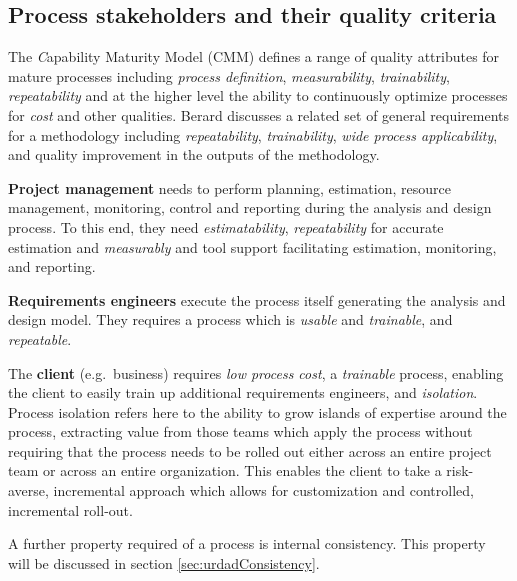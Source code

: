 
\subsection{Process stakeholders and their quality criteria}

The {\emph Capability Maturity Model} (CMM) \cite{paulk_capability_1993} defines a range of quality attributes for mature processes including \emph{process definition}, \emph{measurability}, \emph{trainability}, \emph{repeatability} and at the higher level the ability to continuously optimize processes for \emph{cost} and other qualities. Berard\cite{berard_what_1995} discusses a related set of general requirements for a methodology including \emph{repeatability}, \emph{trainability}, \emph{wide process applicability}, and quality improvement in the outputs of the methodology. 

{\bf Project management} needs to perform planning, estimation, resource management, monitoring, control and reporting during the analysis and design process. To this end, they need \emph{estimatability}, \emph{repeatability} for accurate estimation and \emph{measurably} and tool support facilitating estimation, monitoring, and reporting.

{\bf Requirements engineers} execute the process itself generating the analysis and design model. They requires a process which is \emph{usable} and \emph{trainable}, and \emph{repeatable}.

The {\bf client} (e.g.\ business) requires \emph{low process cost}, a \emph{trainable} process, enabling the client to easily train up additional requirements engineers, and \emph{isolation}. Process isolation refers here to the ability to grow islands of expertise around the process, extracting value from those teams which apply the process without requiring that the process needs to be rolled out either across an entire project team or across an entire organization. This enables the client to take a risk-averse, incremental approach which allows for customization and controlled, incremental roll-out.

A further property required of a process is internal consistency. This property will be discussed in section \ref{sec:urdadConsistency}.

